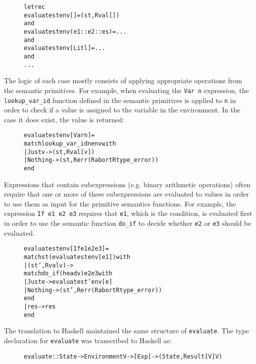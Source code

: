 \begin{figure}[H]
\begin{alltt}
  let rec
  evaluate st env []           = (st, Rval [])
  and
  evaluate st env (e1::e2::es) = ...
  and
  evaluate st env [Lit l]      = ...
  and
  ...
\end{alltt}
\end{figure}

\noindent The logic of each case mostly consists of applying appropriate
operations from the semantic primitives. For example, when evaluating
the \texttt{Var n} expression, the \texttt{lookup\_var\_id} function defined
in the semantic primitives is applied to \texttt{n} in order to check if
a value is assigned to the variable in the environment. In the case it does
exist, the value is returned:

\begin{figure}[H]
\begin{alltt}
  evaluate st env [Var n] =
    match lookup_var_id n env with
    | Just v -> (st, Rval [v])
    | Nothing -> (st, Rerr (Rabort Rtype_error))
    end
\end{alltt}
\end{figure}

\noindent Expressions that contain subexpressions (e.g. binary arithmetic
operations) often require that one or more of these subexpressions are
evaluated to values in order to use them as input for the primitive semantics
functions. For example, the expression \texttt{If e1 e2 e3} requires that
\texttt{e1}, which is the condition, is evaluated first in order to use the
semantic function \texttt{do\_if} to decide whether \texttt{e2} or
\texttt{e3} should be evaluated.

\begin{figure}[H]
\begin{alltt}
  evaluate st env [If e1 e2 e3] =
    match st (evaluate st env [e1]) with
    | (st', Rval v) ->
        match do_if (head v) e2 e3 with
        | Just e -> evaluate st' env [e]
        | Nothing -> (st', Rerr (Rabort Rtype_error))
        end
    | res -> res
    end
\end{alltt}
\end{figure}

The translation to Haskell maintained the same structure of \texttt{evaluate}.
The type declaration for \texttt{evaluate} was transcribed to Haskell as:
\begin{figure}[H]
\begin{alltt}
  evaluate :: State -> Environment V -> [Exp] -> (State, Result [V] V)
\end{alltt}
\end{figure}

